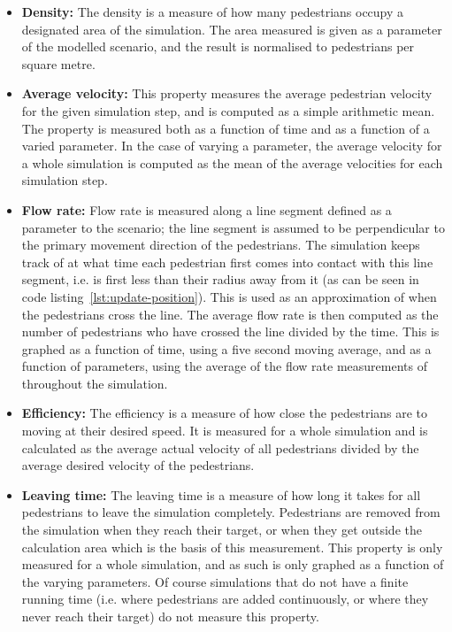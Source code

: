 \begin{itemize}
    \item \textbf{Density:} The density is a measure of how many pedestrians occupy 
        a designated area of the simulation. The area measured is given as a 
        parameter of the modelled scenario, and the result is normalised to 
        pedestrians per square metre.

    \item \textbf{Average velocity:} This property measures the average pedestrian 
        velocity for the given simulation step, and is computed as a simple 
        arithmetic mean. The property is measured both as a function of time 
        and as a function of a varied parameter. In the case of varying a 
        parameter, the average velocity for a whole simulation is computed as 
        the mean of the average velocities for each simulation step.

    \item \textbf{Flow rate:} Flow rate is measured along a line segment 
        defined as a parameter to the scenario; the line segment is assumed to 
        be perpendicular to the primary movement direction of the pedestrians. 
        The simulation keeps track of at what time each pedestrian first comes 
        into contact with this line segment, i.e. is first less than their 
        radius away from it (as can be seen in code 
        listing~\ref{lst:update-position}). This is used as an approximation 
        of when the pedestrians cross the line. The average flow rate is then 
        computed as the number of pedestrians who have crossed the line 
        divided by the time.  This is graphed as a function of time, using a 
        five second moving average, and as a function of parameters, using the 
        average of the flow rate measurements of throughout the simulation.

    \item \textbf{Efficiency:} The efficiency is a measure of how close the 
        pedestrians are to moving at their desired speed. It is measured for a 
        whole simulation and is calculated as the average actual velocity of 
        all pedestrians divided by the average desired velocity of the pedestrians.

    \item \textbf{Leaving time:} The leaving time is a measure of how long it 
        takes for all pedestrians to leave the simulation completely. Pedestrians are 
        removed from the simulation when they reach their target, or when they 
        get outside the calculation area which is the basis of this 
        measurement. This property is only measured for a whole simulation, 
        and as such is only graphed as a function of the varying parameters. 
        Of course simulations that do not have a finite running time (i.e. 
        where pedestrians are added continuously, or where they never reach their 
        target) do not measure this property.
\end{itemize}
